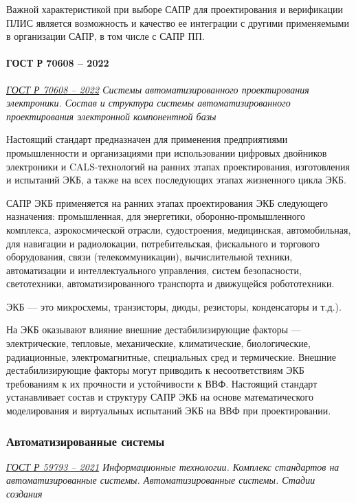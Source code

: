 Важной характеристикой при выборе САПР для проектирования
и верификации ПЛИС является возможность
и качество ее интеграции с другими применяемыми в организации САПР,
в том числе с САПР ПП.

\paragraph{ГОСТ Р 70608 -- 2022}

\emph{\href{https://docs.cntd.ru/document/1200195173}{ГОСТ Р 70608 -- 2022}
Системы автоматизированного проектирования электроники.
Состав и структура системы автоматизированного проектирования электронной компонентной базы
}

Настоящий стандарт предназначен для применения предприятиями промышленности
и организациями при использовании цифровых двойников электроники
и CALS-технологий на ранних этапах проектирования,
изготовления и испытаний ЭКБ,
а также на всех последующих этапах жизненного цикла ЭКБ.

САПР ЭКБ применяется на ранних этапах проектирования ЭКБ следующего назначения:
промышленная, для энергетики, оборонно-промышленного комплекса,
аэрокосмической отрасли, судостроения, медицинская, автомобильная,
для навигации и радиолокации, потребительская, фискального
и торгового оборудования, связи (телекоммуникации), вычислительной техники,
автоматизации и интеллектуального управления, систем безопасности,
светотехники, автоматизированного транспорта и движущейся робототехники.

ЭКБ --- это микросхемы, транзисторы, диоды, резисторы, конденсаторы и т.д.).

На ЭКБ оказывают влияние внешние дестабилизирующие факторы --- электрические,
тепловые, механические, климатические, биологические, радиационные,
электромагнитные, специальных сред и термические.
Внешние дестабилизирующие факторы могут приводить
к несоответствиям ЭКБ требованиям к их прочности и устойчивости к ВВФ.
Настоящий стандарт устанавливает состав
и структуру САПР ЭКБ на основе математического моделирования
и виртуальных испытаний ЭКБ на ВВФ при проектировании.

\subsubsection{Автоматизированные системы}

\emph{\href{https://docs.cntd.ru/document/1200181349}{ГОСТ Р 59793 -- 2021}
Информационные технологии.
Комплекс стандартов на автоматизированные системы.
Автоматизированные системы. Стадии создания
}

